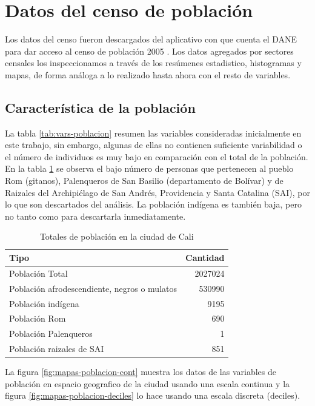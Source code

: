 \documentclass[12pt,]{book}
\begin{document}
\section{Datos del censo de
población}\label{datos-del-censo-de-poblacion}

Los datos del censo fueron descargados del aplicativo con que cuenta el
DANE para dar acceso al censo de población 2005
\citep{censo_sistema_dane}. Los datos agregados por sectores censales
los inspeccionamos a través de los resúmenes estadistico, histogramas y
mapas, de forma análoga a lo realizado hasta ahora con el resto de
variables.

\subsection{Característica de la
población}\label{caracteristica-de-la-poblacion}

La tabla \ref{tab:vars-poblacion} resumen las variables consideradas
inicialmente en este trabajo, sin embargo, algunas de ellas no contienen
suficiente variabilidad o el número de individuos es muy bajo en
comparación con el total de la población. En la tabla
\ref{tab:totales-poblacion} se observa el bajo número de personas que
pertenecen al pueblo Rom (gitanos), Palenqueros de San Basilio
(departamento de Bolívar) y de Raizales del Archipiélago de San Andrés,
Providencia y Santa Catalina (SAI), por lo que son descartados del
análisis. La población indígena es también baja, pero no tanto como para
descartarla inmediatamente.

\begin{table}

\caption{\label{tab:totales-poblacion}Totales de población en la ciudad de Cali}
\centering
\begin{tabular}[t]{l|r}
\hline
Tipo & Cantidad\\
\hline
Población Total & 2027024\\
\hline
Población afrodescendiente, negros o mulatos & 530990\\
\hline
Población indígena & 9195\\
\hline
Población Rom & 690\\
\hline
Población Palenqueros & 1\\
\hline
Población raizales de SAI & 851\\
\hline
\end{tabular}
\end{table}

La figura \ref{fig:mapas-poblacion-cont} muestra los datos de las
variables de población en espacio geografico de la ciudad usando una
escala continua y la figura \ref{fig:mapas-poblacion-deciles} lo hace
usando una escala discreta (deciles).
\end{document}
